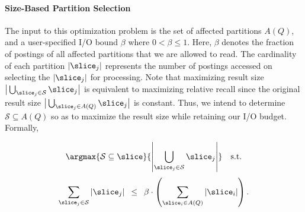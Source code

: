\paragraph{Size-Based Partition Selection}
\label{sec:ebps}
The input to this optimization problem is the set of affected
partitions $A(Q)$, and a
user-specified I/O bound $\beta$ where $0 < \beta \leq 1$. Here, $\beta$ denotes the fraction of postings of all affected partitions that we are allowed to read. The cardinality of each partition $|\slice_j|$ represents the number of postings accessed on selecting the $|\slice_j|$ for processing. Note that maximizing result size $\big\vert \bigcup_{\slice_j \in \mathcal{S}}{\slice_{j}} \big\vert$ is equivalent to maximizing relative recall since the original result size $\big\vert \bigcup_{\slice_j \in A(Q) }{\slice_{j}} \big\vert$ is constant. Thus, we intend to determine $\mathcal{S} \subseteq A(Q)$ so as to maximize the result size while retaining our I/O budget. Formally, 



\begin{definition}
\label{def:sbs_sts}
\begin{equation*}
  \argmax{\mathcal{S} \subseteq \slice}{\left| \bigcup_{\slice_j \in \mathcal{S}}{\slice_{j}} \right|} \quad \mbox {s.t.}  
\end{equation*}
\begin{equation*}
  \sum_{\slice_j \in \mathcal{S}} |\slice_{j}| \,\,\,\leq \,\,\,\beta \cdot \left(\sum_{\slice_i \in A(Q)}|\slice_{i}|\right).  
\end{equation*}
\end{definition}




